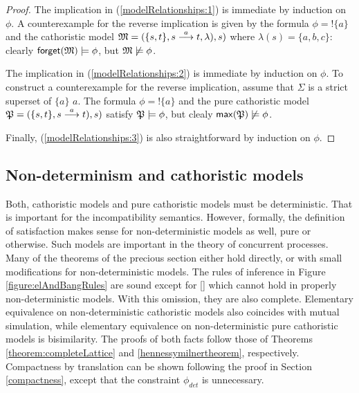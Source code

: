 \begin{proof}
The implication in (\ref{modelRelationships:1}) is immediate by
induction on $\phi$. A counterexample for the reverse implication is
given by the formula $\phi = !\{a\}$ and the cathoristic model $\frak{M} = ( \{s,
t\}, s \stackrel{a}{\longrightarrow} t, \lambda), s)$ where $\lambda (s) = \{a, b, c\}$:
clearly $\mathsf{forget}(\frak{M}) \models \phi$, but $\frak{M} \not\models
\phi$.

The implication in (\ref{modelRelationships:2}) is immediate by
induction on $\phi$. To construct a counterexample for the reverse
implication, assume that $\Sigma$ is a strict superset of $\{a\}$
$a$. The formula $\phi = !\{a\}$ and the pure cathoristic model $\frak{P} = (
\{s, t\}, s \stackrel{a}{\longrightarrow} t ), s)$ satisfy $\frak{P} \models \phi$, but clealy
$\mathsf{max}(\frak{P}) \not\models \phi$.

Finally, (\ref{modelRelationships:3}) is also straightforward by
induction on $\phi$.

\end{proof}

\subsection{Non-determinism and cathoristic models}

Both, cathoristic models and pure cathoristic models must be deterministic. That
is important for the incompatibility semantics. However, formally, the
definition of satisfaction makes sense for non-deterministic models as
well, pure or otherwise. Such models are important in the theory of
concurrent processes. Many of the theorems of the precious section
either hold directly, or with small modifications for
non-deterministic models. The rules of inference in Figure
\ref{figure:elAndBangRules} are sound except for
    [] which cannot hold in properly
    non-deterministic models. With this omission, they are also
    complete.  Elementary equivalence on non-deterministic cathoristic
    models also coincides with mutual simulation, while elementary
    equivalence on non-deterministic pure cathoristic models is
    bisimilarity. The proofs of both facts follow those of Theorems
    \ref{theorem:completeLattice} and \ref{hennessymilnertheorem},
    respectively. Compactness by translation can be shown following
    the proof in Section \ref{compactness}, except that the constraint
    $\phi_{det}$ is unnecessary.

